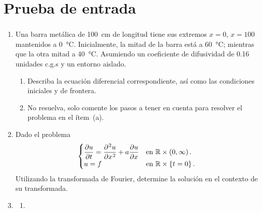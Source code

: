 \section{Prueba de entrada}

\begin{frame}
	\frametitle{\insertsection}

	\begin{enumerate}
		\item

		      Una barra metálica de \qty{100}{\centi\metre} de longitud tiene sus
		      extremos $x=0$, $x=100$ mantenidos a \qty{0}{\degreeCelsius}.
		      Inicialmente, la mitad de la barra está a \qty{60}{\degreeCelsius};
		      mientras que la otra mitad a \qty{40}{\degreeCelsius}.
		      Asumiendo un coeficiente de difusividad de \num{0.16} unidades c.g.s
		      y un entorno aislado.

		      \begin{enumerate}
			      \item

			            Describa la ecuación diferencial correspondiente, así como las
			            condiciones iniciales y de frontera.

			      \item

			            No resuelva, solo comente los pasos a tener en cuenta para resolver
			            el problema en el ítem~(a).
		      \end{enumerate}

		\item

		      Dado el problema
		      \begin{equation*}
			      \begin{cases}\displaystyle
				      \diffp{u}{t}=
				      \diffp[2]{u}{x}+
				      a\diffp{u}{x} &
				      \text{en }\mathbb{R}\times\left(0,\infty\right). \\
				      u=f           &
				      \text{en }\mathbb{R}\times\left\{t=0\right\}.
			      \end{cases}
		      \end{equation*}
		      Utilizando la transformada de Fourier, determine la solución en el contexto de su transformada.

		\item

		      \begin{enumerate}
			      \item


\end{enumerate}
\end{enumerate}
\end{frame}
